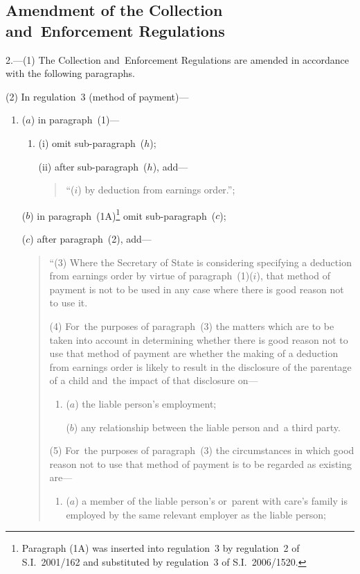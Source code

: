 \documentclass[12pt,a4paper]{article}
\begin{document}
\subsection[2. Amendment of the Collection and~Enforcement Regulations]{Amendment of the Collection and~Enforcement Regulations}

2.---(1)  The Collection and~Enforcement Regulations are amended in accordance with the following paragraphs.

(2) In regulation~3 (method of payment)—
\begin{enumerate}\item[]
($a$) in paragraph~(1)—
\begin{enumerate}\item[]
(i) omit sub-paragraph~($h$);

(ii) after sub-paragraph~($h$), add—
\begin{quotation}
“($i$) by deduction from earnings order.”;
\end{quotation}
\end{enumerate}

($b$) in paragraph~(1A)\footnote{Paragraph (1A) was inserted into regulation~3 by regulation~2 of S.I.~2001/162 and substituted by regulation~3 of S.I.~2006/1520.} omit sub-paragraph~($c$);

($c$) after paragraph~(2), add—
\begin{quotation}
“(3) Where the Secretary of State is considering specifying a deduction from earnings order by virtue of paragraph~(1)($i$), that method of payment is not to be used in any case where there is good reason not to use it.

(4) For~the purposes of paragraph~(3) the matters which are to be taken into account in determining whether there is good reason not to use that method of payment are whether the making of a deduction from earnings order is likely to result in the disclosure of the parentage of a child and~the impact of that disclosure on—
\begin{enumerate}\item[]
($a$) the liable person’s employment;

($b$) any relationship between the liable person and~a third party.
\end{enumerate}

(5) For~the purposes of paragraph~(3) the circumstances in which good reason not to use that method of payment is to be regarded as existing are—
\begin{enumerate}\item[]
($a$) a member of the liable person’s or~parent with care’s family is employed by the same relevant employer as the liable person;


\end{enumerate}
\end{quotation}
\end{enumerate}
\end{document}
